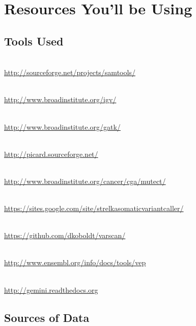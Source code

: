 
\section{Resources You'll be Using}

\subsection{Tools Used}

\begin{description}[style=multiline,labelindent=0cm,align=left,leftmargin=1cm]
  \item[SAMTools] \hfill\\
    \url{http://sourceforge.net/projects/samtools/}
  \item[IGV] \hfill\\
    \url{http://www.broadinstitute.org/igv/}
  \item[Genome Analysis Toolkit] \hfill\\
    \url{http://www.broadinstitute.org/gatk/}
  \item[Picard] \hfill\\
    \url{http://picard.sourceforge.net/}
  \item[MuTect] \hfill\\
    \url{http://www.broadinstitute.org/cancer/cga/mutect/}
  \item[Strelka] \hfill\\
    \url{https://sites.google.com/site/strelkasomaticvariantcaller/}
  \item[VarScan2] \hfill\\
    \url{https://github.com/dkoboldt/varscan/}
  \item[Variant Effect Predictor] \hfill\\
    \url{http://www.ensembl.org/info/docs/tools/vep}
  \item[GEMINI] \hfill\\
    \url{http://gemini.readthedocs.org}
\end{description}


\subsection{Sources of Data}

